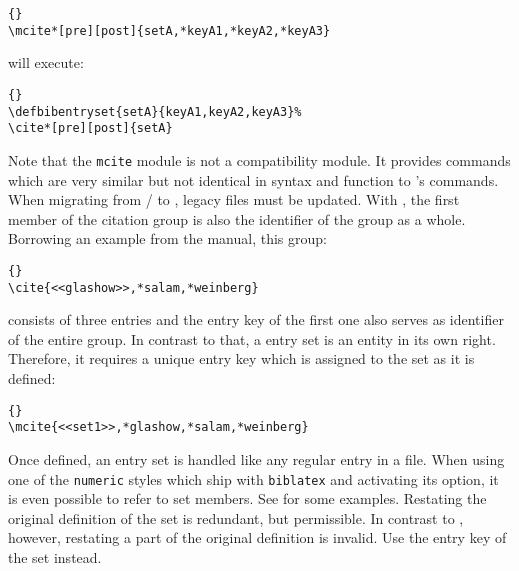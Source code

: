 \documentclass{ltxdockit}[2011/03/25]
\begin{document}
\begin{lstlisting}[style=latex]{}
\mcite*[pre][post]{setA,*keyA1,*keyA2,*keyA3}
\end{lstlisting}
%
will execute:

\begin{lstlisting}[style=latex]{}
\defbibentryset{setA}{keyA1,keyA2,keyA3}%
\cite*[pre][post]{setA}
\end{lstlisting}
%
Note that the \texttt{mcite} module is not a compatibility module. It provides commands which are very similar but not identical in syntax and function to 's commands. When migrating from \slash{} to , legacy files must be updated. With , the first member of the citation group is also the identifier of the group as a whole. Borrowing an example from the  manual, this group:

\begin{table}
\tablesetup
{}
\caption{-like commands}
\label{use:cit:mct:tab1}
\end{table}

\begin{lstlisting}[style=latex]{}
\cite{<<glashow>>,*salam,*weinberg}
\end{lstlisting}
%
consists of three entries and the entry key of the first one also serves as identifier of the entire group. In contrast to that, a  entry set is an entity in its own right. Therefore, it requires a unique entry key which is assigned to the set as it is defined:

\begin{lstlisting}[style=latex]{}
\mcite{<<set1>>,*glashow,*salam,*weinberg}
\end{lstlisting}
%
Once defined, an entry set is handled like any regular entry in a  file. When using one of the \texttt{numeric} styles which ship with \texttt{biblatex} and activating its  option, it is even possible to refer to set members. See  for some examples. Restating the original definition of the set is redundant, but permissible. In contrast to , however, restating a part of the original definition is invalid. Use the entry key of the set instead.
\end{document}
